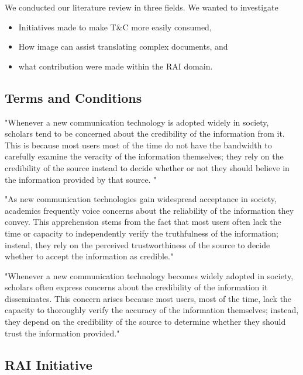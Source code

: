 \documentclass[manuscript,review,anonymous]{acmart}
\begin{document}
	We conducted our literature review in three fields. We wanted to investigate
	\begin{itemize}
		\item Initiatives made to make T\&C more easily consumed,
		\item How image can assist translating complex documents, and
		\item what contribution were made within the RAI domain.
	\end{itemize}

\subsection{Terms and Conditions}

	"Whenever a new communication technology is adopted widely in society, scholars tend to be concerned about the credibility of the information from it. This is because most users most of the time do not have the bandwidth to carefully examine the veracity of the information themselves; they rely on the credibility of the source instead to decide whether or not they should believe in the information provided by that source. \cite{10.1145/3613905.3650862}"
	
	"As new communication technologies gain widespread acceptance in society, academics frequently voice concerns about the reliability of the information they convey. This apprehension stems from the fact that most users often lack the time or capacity to independently verify the truthfulness of the information; instead, they rely on the perceived trustworthiness of the source to decide whether to accept the information as credible."

	"Whenever a new communication technology becomes widely adopted in society, scholars often express concerns about the credibility of the information it disseminates. This concern arises because most users, most of the time, lack the capacity to thoroughly verify the accuracy of the information themselves; instead, they depend on the credibility of the source to determine whether they should trust the information provided."

\subsection{RAI Initiative}
\end{document}
